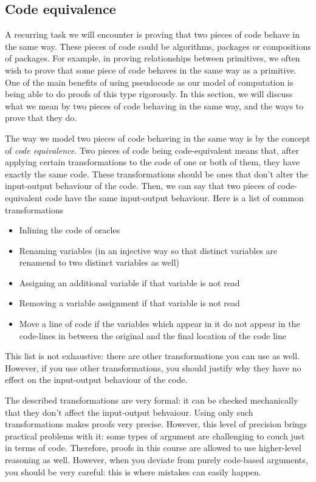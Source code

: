 \subsection{Code equivalence}
A recurring task we will encounter is proving that two pieces of code behave in the same way. These pieces of code could be algorithms, packages or compositions of packages. For example, in proving relationships between primitives, we often wish to prove that some piece of code behaves in the same way as a primitive. One of the main benefits of using pseudocode as our model of computation is being able to do proofs of this type rigorously. In this section, we will discuss what we mean by two pieces of code behaving in the same way, and the ways to prove that they do.

The way we model two pieces of code behaving in the same way is by the concept of \emph{code equivalence}. Two pieces of code being code-equivalent means that, after applying certain transformations to the code of one or both of them, they have exactly the same code. These transformations should be ones that don't alter the input-output behaviour of the code. Then, we can say that two pieces of code-equivalent code have the same input-output behaviour. Here is a list of common transformations 
\begin{itemize}
    \item Inlining the code of oracles 
    \item Renaming variables (in an injective way so that distinct variables are renamend to two distinct variables as well)
    \item Assigning an additional variable if that variable is not read
    \item Removing a variable assignment if that variable is not read
    \item Move a line of code if the variables which appear in it do not appear in the code-lines in between the original and the final location of the code line   
\end{itemize}
This list is not exhaustive: there are other transformations you can use as well. However, if you use other transformations, you should justify why they have no effect on the input-output behaviour of the code.

The described transformations are very formal: it can be checked mechanically that they don't affect the input-output behvaiour. Using only such transformations makes proofs very precise. However, this level of precision brings practical problems with it: some types of argument are challenging to couch just in terms of code. Therefore, proofs in this course are allowed to use higher-level reasoning as well. However, when you deviate from purely code-based arguments, you should be very careful: this is where mistakes can easily happen.

